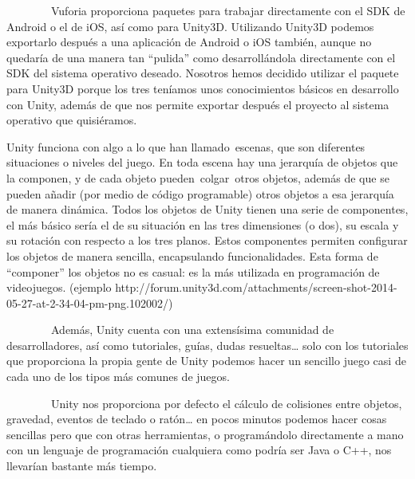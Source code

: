 
~~~~~~~~Vuforia proporciona paquetes para trabajar directamente con el
SDK de Android o el de iOS, así como para Unity3D. Utilizando Unity3D
podemos exportarlo después a una aplicación de Android o iOS también,
aunque no quedaría de una manera tan ``pulida'' como desarrollándola
directamente con el SDK del sistema operativo deseado. Nosotros hemos
decidido utilizar el paquete para Unity3D porque los tres teníamos unos
conocimientos básicos en desarrollo con Unity, además de que nos permite
exportar después el proyecto al sistema operativo que quisiéramos.


Unity funciona con algo a lo que han llamado~escenas, que son diferentes
situaciones o niveles del juego. En toda escena hay una jerarquía de
objetos que la componen, y de cada objeto pueden~colgar~otros objetos,
además de que se pueden añadir (por medio de código programable) otros
objetos a esa jerarquía de manera dinámica. Todos los objetos de Unity
tienen una serie de componentes, el más básico sería el de su situación
en las tres dimensiones (o dos), su escala y su rotación con respecto a
los tres planos. Estos componentes permiten configurar los objetos de
manera sencilla, encapsulando funcionalidades. Esta forma de
``componer'' los objetos no es casual: es la más utilizada en
programación de videojuegos. (ejemplo
http://forum.unity3d.com/attachments/screen-shot-2014-05-27-at-2-34-04-pm-png.102002/)

~~~~~~~~Además, Unity cuenta con una extensísima comunidad de
desarrolladores, así como tutoriales, guías, dudas resueltas\ldots{}
solo con los tutoriales que proporciona la propia gente de Unity podemos
hacer un sencillo juego casi de cada uno de los tipos más comunes de
juegos.

~~~~~~~~Unity nos proporciona por defecto el cálculo de colisiones entre
objetos, gravedad, eventos de teclado o ratón\ldots{} en pocos minutos
podemos hacer cosas sencillas pero que con otras herramientas, o
programándolo directamente a mano con un lenguaje de programación
cualquiera como podría ser Java o C++, nos llevarían bastante más
tiempo.

